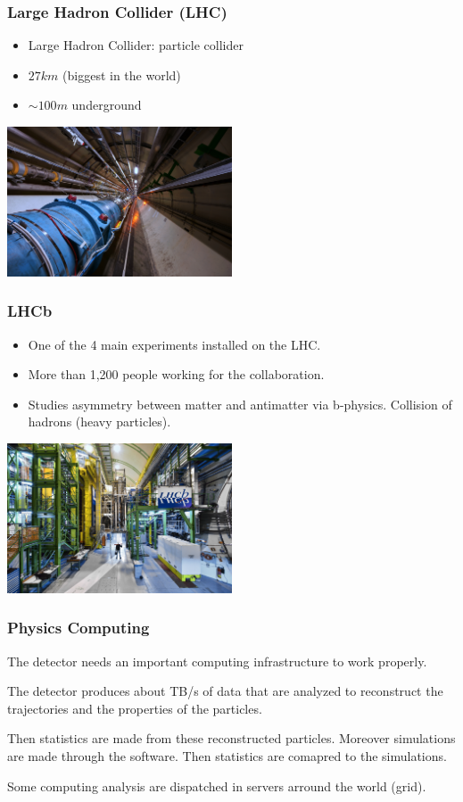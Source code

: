 \documentclass{beamer}
\begin{document}
    \begin{frame}
        \frametitle{Large Hadron Collider (LHC)}

        \begin{itemize}
            \item Large Hadron Collider: particle collider
            \item $ 27 km $ (biggest in the world)
            \item $ \sim 100 m $ underground
        \end{itemize}

        \includegraphics[width=0.5\textwidth]{LHC.jpg}
    \end{frame}

    \begin{frame}
        \frametitle{LHCb}

        \begin{itemize}
            \item One of the 4 main experiments installed on the LHC.
            \item More than 1,200 people working for the collaboration.
            \item Studies asymmetry between matter and antimatter via b-physics.
            Collision of hadrons (heavy particles).
        \end{itemize}

        \includegraphics[width=0.5\textwidth]{LHCb.jpg}
    \end{frame}

    \begin{frame}
        \frametitle{Physics Computing}

        The detector needs an important computing infrastructure to work properly.

        The detector produces about TB/s of data that are analyzed to reconstruct the trajectories and the properties of the particles.

        Then statistics are made from these reconstructed particles.
        Moreover simulations are made through the software.
        Then statistics are comapred to the simulations.

        Some computing analysis are dispatched in servers arround the world (grid).
    \end{frame}
\end{document}
